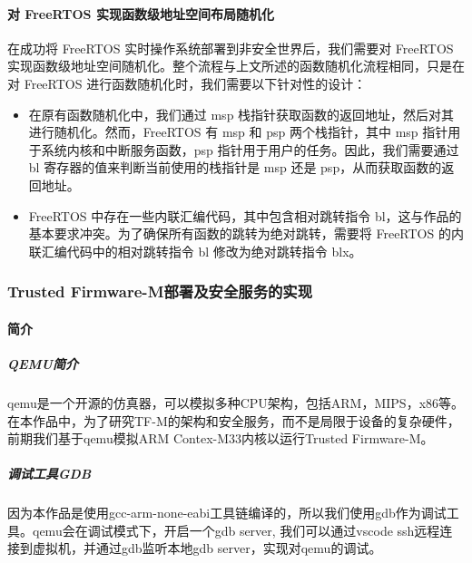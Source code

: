 \documentclass[12pt,a4paper]{ctexart}
\numberwithin{figure}{section}
\begin{document}
\paragraph{对 FreeRTOS 实现函数级地址空间布局随机化}
\par 在成功将 FreeRTOS 实时操作系统部署到非安全世界后，我们需要对 FreeRTOS 实现函数级地址空间随机化。整个流程与上文所述的函数随机化流程相同，只是在对 FreeRTOS 进行函数随机化时，我们需要以下针对性的设计：
\begin{itemize}
    \item 在原有函数随机化中，我们通过 msp 栈指针获取函数的返回地址，然后对其进行随机化。然而，FreeRTOS 有 msp 和 psp 两个栈指针，其中 msp 指针用于系统内核和中断服务函数，psp 指针用于用户的任务。因此，我们需要通过 bl 寄存器的值来判断当前使用的栈指针是 msp 还是 psp，从而获取函数的返回地址。
    \item FreeRTOS 中存在一些内联汇编代码，其中包含相对跳转指令 bl，这与作品的基本要求冲突。为了确保所有函数的跳转为绝对跳转，需要将 FreeRTOS 的内联汇编代码中的相对跳转指令 bl 修改为绝对跳转指令 blx。
\end{itemize}

\subsubsection{Trusted Firmware-M部署及安全服务的实现}
\paragraph{简介}
\subparagraph{QEMU简介}
\par qemu是一个开源的仿真器，可以模拟多种CPU架构，包括ARM，MIPS，x86等。在本作品中，为了研究TF-M的架构和安全服务，而不是局限于设备的复杂硬件，前期我们基于qemu模拟ARM Contex-M33内核以运行Trusted Firmware-M。
\subparagraph{调试工具GDB}
因为本作品是使用gcc-arm-none-eabi工具链编译的，所以我们使用gdb作为调试工具。qemu会在调试模式下，开启一个gdb server, 我们可以通过vscode ssh远程连接到虚拟机，并通过gdb监听本地gdb server，实现对qemu的调试。
\end{document}
